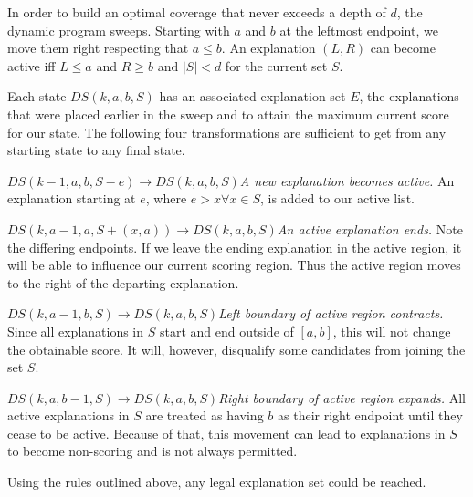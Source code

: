 \documentclass[11pt,twocolumn]{article}
\begin{document}
In order to build an optimal coverage that never exceeds a depth of $d$, the dynamic program sweeps.  Starting with $a$ and $b$ at the leftmost endpoint, we move them right respecting that $a \leq b$.  An explanation $(L,R)$ can become active iff $L\leq a$ and $R \geq b$ and $|S|<d$ for the current set $S$.

Each state $DS(k,a,b,S)$ has an associated explanation set $E$, the explanations that were placed earlier in the sweep and to attain the maximum current score for our state.  The following four transformations are sufficient to get from any starting state to any final state.

$ DS(k-1,a,b,S-e) \rightarrow DS(k,a,b,S)${\it A new explanation becomes active.} An explanation starting at $e$, where $e > x \forall x \in S$, is added to our active list.

$ DS(k,a-1,a,S + (x,a)) \rightarrow DS(k,a,b,S)${\it An active explanation ends.}  Note the differing endpoints.  If we leave the ending explanation in the active region, it will be able to influence our current scoring region. Thus the active region moves to the right of the departing explanation.

$DS(k,a-1,b,S) \rightarrow DS(k, a, b, S )${\it Left boundary of active region contracts.} Since all explanations in $S$ start and end outside of $[a,b]$, this will not change the obtainable score.  It will, however, disqualify some candidates from joining the set $S$.

$DS(k,a,b-1,S) \rightarrow DS(k, a, b, S )${\it Right boundary of active region expands.} All active explanations in $S$ are treated as having $b$ as their right endpoint until they cease to be active.  Because of that, this movement can lead to explanations in $S$ to become non-scoring and is not always permitted.

\begin{lem} \label{lem:dpCorrect}
Using the rules outlined above, any legal explanation set could be reached.
\end{lem}
\end{document}
